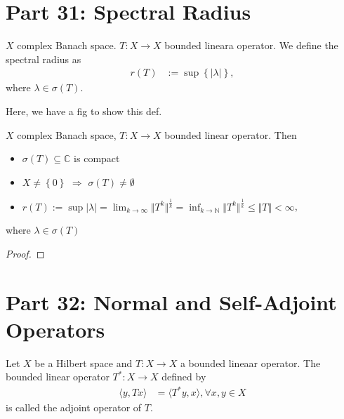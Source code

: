 \documentclass[../../note.tex]{subfiles}
\begin{document}

\section{Part 31: Spectral Radius}
\begin{definition}
    $X$ complex Banach space. $T: X \rightarrow X$ bounded lineara operator. We define the spectral radius as
    \begin{align}
        r(T)
        &:= \sup\left\{\vert \lambda \vert \right\},
    \end{align}
    where $\lambda \in \sigma(T)$.
\end{definition}
Here, we have a fig to show this def.

\begin{theorem}
    $X$ complex Banach space, $T: X \rightarrow X$ bounded linear operator. Then 
    \begin{itemize}
        \item $\sigma(T) \subseteq \mathbb{C}$ is compact
        \item $X\neq\left\{0\right\}$ $\Longrightarrow$ $\sigma(T)\neq \emptyset$
        \item $r(T):= \sup \vert \lambda \vert = \lim_{k \rightarrow \infty} \Vert T^k \Vert^{\frac{1}{k}} = \inf_{k \rightarrow \mathbb{N}} \Vert T^k \Vert^{\frac{1}{k}} \leq \Vert T \Vert < \infty$,
    \end{itemize}
    where $\lambda \in \sigma(T)$
\end{theorem}
\begin{proof}
    
\end{proof}


\section{Part 32: Normal and Self-Adjoint Operators}
\begin{definition}
    Let $X$ be a Hilbert space and $T: X \rightarrow X$ a bounded lineaar operator. The bounded linear operator $T^\ast: X \rightarrow X$ defined by
    \begin{align}
        \langle y, Tx \rangle
        &= \langle T^\ast y, x \rangle, \forall x,y \in X
    \end{align}
    is called the adjoint operator of $T$.
\end{definition}
\end{document}
